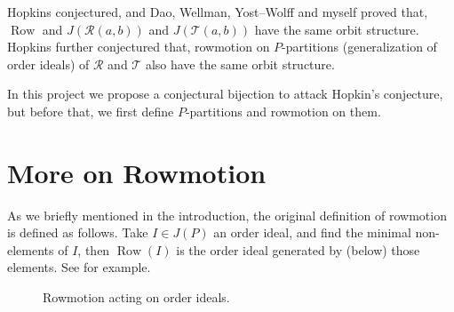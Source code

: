\documentclass[12pt]{amsart}
\newcommand{\rrr}[0]{\mathscr{R}}
\newcommand{\ttt}[0]{\mathscr{T}}
\theoremstyle{plain}
\theoremstyle{definition}
\DeclareMathOperator{\row}{Row}
\begin{document}
Hopkins \cite{hopkins2019minuscule} conjectured, and Dao, Wellman, Yost--Wolff and myself \cite{dao2020rowmotion} proved that, $\row$ and $J(\rrr(a,b))$ and $J(\ttt(a,b))$ have the same orbit structure. Hopkins further conjectured that, rowmotion on $P$-partitions (generalization of order ideals) of $\rrr$ and $\ttt$ also have the same orbit structure. 

In this project we propose a conjectural bijection to attack Hopkin's conjecture, but before that, we first define $P$-partitions and rowmotion on them.
\section{More on Rowmotion}
As we briefly mentioned in the introduction, the original definition of rowmotion is defined as follows. Take $I\in J(P)$ an order ideal, and find the minimal non-elements of $I$, then $\row(I)$ is the order ideal generated by (below) those elements. See  for example.
\begin{figure}[h]
    \centering
    \caption{Rowmotion acting on order ideals.}
    \label{fig:rowmotion_example}
\end{figure}
\end{document}
